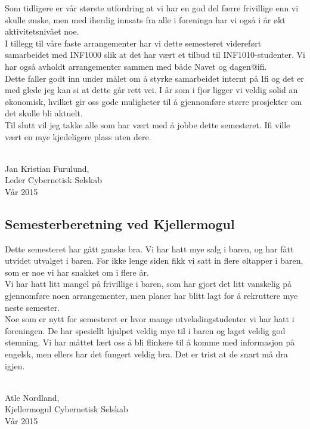 \documentclass[10pt,norsk,a4paper]{article}
\begin{document}
Som tidligere er vår største utfordring at vi har en god del færre frivillige enn vi skulle ønske, men med iherdig innsats fra alle i foreninga har vi også i år økt aktivitetsnivået noe.\\

I tillegg til våre faste arrangementer har vi dette semesteret videreført samarbeidet med INF1000 slik at det har vært et tilbud til INF1010-studenter. Vi har også avholdt arrangementer sammen med både Navet og dagen@ifi.\\

Dette faller godt inn under målet om å styrke samarbeidet internt på Ifi og det er med glede jeg kan si at dette går rett vei. I år som i fjor ligger vi veldig solid an økonomisk, hvilket gir oss gode muligheter til å gjennomføre større prosjekter om det skulle bli aktuelt. \\

Til slutt vil jeg takke alle som har vært med å jobbe dette semesteret. Ifi ville vært en mye kjedeligere plass uten dere.\\
\

Jan Kristian Furulund,\\
Leder Cybernetisk Selskab\\
Vår 2015



\subsection{Semesterberetning ved Kjellermogul}
Dette semesteret har gått ganske bra. Vi har hatt mye salg i baren, og har fått utvidet utvalget i baren. For ikke lenge siden fikk vi satt in flere øltapper i baren, som er noe vi har snakket om i flere år.\\

Vi har hatt litt mangel på frivillige i baren, som har gjort det litt vanskelig på gjennomføre noen arrangementer, men planer har blitt lagt for å rekruttere mye neste semester.\\

Noe som er nytt for semesteret er hvor mange utvekslingstudenter vi har hatt i foreningen. De har spesiellt hjulpet veldig mye til i baren og laget veldig god stemning. Vi har måttet lært oss å bli flinkere til å komme med informasjon på engelsk, men ellers har det fungert veldig bra. Det er trist at de snart må dra igjen.\\
\

Atle Nordland,\\
Kjellermogul Cybernetisk Selskab\\
Vår 2015
\end{document}
